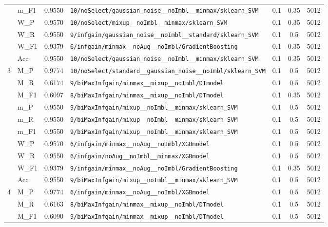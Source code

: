 \begin{table}[htbp]
\begin{tabular}{|c|l|c|>{\ttfamily\footnotesize}p{7.2cm}|c|c|c|}
 & m\_F1 & 0.9550 & \texttt{10/noSelect/gaussian\_noise\_\_noImbl\_\_minmax/sklearn\_SVM} & 0.1 & 0.35  & 5012 \\ 
 & W\_P & 0.9570 & \texttt{10/noSelect/mixup\_\_noImbl\_\_minmax/sklearn\_SVM} & 0.1 & 0.35  & 5012 \\ 
 & W\_R & 0.9550 & \texttt{9/infgain/gaussian\_noise\_\_noImbl\_\_standard/sklearn\_SVM} & 0.1 & 0.5  & 5012 \\ 
 & W\_F1 & 0.9379 & \texttt{6/infgain/minmax\_\_noAug\_\_noImbl/GradientBoosting} & 0.1 & 0.35  & 5012 \\ 
 & Acc & 0.9550 & \texttt{10/noSelect/gaussian\_noise\_\_noImbl\_\_minmax/sklearn\_SVM} & 0.1 & 0.35  & 5012 \\ 
\hline
\multirow{10}{*}{3} & M\_P & 0.9774 & \texttt{10/noSelect/standard\_\_gaussian\_noise\_\_noImbl/sklearn\_SVM} & 0.1 & 0.5  & 5012 \\ 
 & M\_R & 0.6174 & \texttt{9/biMaxInfgain/minmax\_\_mixup\_\_noImbl/DTmodel} & 0.1 & 0.5  & 5012 \\ 
 & M\_F1 & 0.6097 & \texttt{8/biMaxInfgain/minmax\_\_mixup\_\_noImbl/DTmodel} & 0.1 & 0.35  & 5012 \\ 
 & m\_P & 0.9550 & \texttt{9/biMaxInfgain/mixup\_\_noImbl\_\_minmax/sklearn\_SVM} & 0.1 & 0.5  & 5012 \\ 
 & m\_R & 0.9550 & \texttt{9/biMaxInfgain/mixup\_\_noImbl\_\_minmax/sklearn\_SVM} & 0.1 & 0.5  & 5012 \\ 
 & m\_F1 & 0.9550 & \texttt{9/biMaxInfgain/mixup\_\_noImbl\_\_minmax/sklearn\_SVM} & 0.1 & 0.5  & 5012 \\ 
 & W\_P & 0.9570 & \texttt{6/infgain/minmax\_\_noAug\_\_noImbl/XGBmodel} & 0.1 & 0.5  & 5012 \\ 
 & W\_R & 0.9550 & \texttt{6/infgain/noAug\_\_noImbl\_\_minmax/XGBmodel} & 0.1 & 0.5  & 5012 \\ 
 & W\_F1 & 0.9379 & \texttt{9/infgain/minmax\_\_noAug\_\_noImbl/GradientBoosting} & 0.1 & 0.35  & 5012 \\ 
 & Acc & 0.9550 & \texttt{9/biMaxInfgain/mixup\_\_noImbl\_\_minmax/sklearn\_SVM} & 0.1 & 0.5  & 5012 \\ 
\hline
\multirow{10}{*}{4} & M\_P & 0.9774 & \texttt{6/infgain/minmax\_\_noAug\_\_noImbl/XGBmodel} & 0.1 & 0.5  & 5012 \\ 
 & M\_R & 0.6163 & \texttt{8/biMaxInfgain/minmax\_\_mixup\_\_noImbl/DTmodel} & 0.1 & 0.5  & 5012 \\ 
 & M\_F1 & 0.6090 & \texttt{9/biMaxInfgain/minmax\_\_mixup\_\_noImbl/DTmodel} & 0.1 & 0.5  & 5012 \\ 

\end{tabular}
\end{table}
